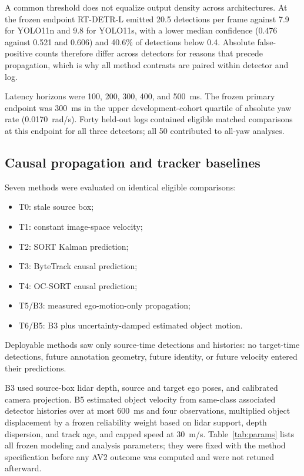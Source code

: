 \documentclass[journal]{IEEEtran}
\begin{document}
A common threshold does not equalize output density across architectures. At the frozen endpoint RT-DETR-L emitted 20.5 detections per frame against 7.9 for YOLO11n and 9.8 for YOLO11s, with a lower median confidence (0.476 against 0.521 and 0.606) and 40.6\% of detections below 0.4. Absolute false-positive counts therefore differ across detectors for reasons that precede propagation, which is why all method contrasts are paired within detector and log.

Latency horizons were 100, 200, 300, 400, and 500~ms. The frozen primary endpoint was 300~ms in the upper development-cohort quartile of absolute yaw rate (0.0170~rad/s). Forty held-out logs contained eligible matched comparisons at this endpoint for all three detectors; all 50 contributed to all-yaw analyses.

\subsection{Causal propagation and tracker baselines}
Seven methods were evaluated on identical eligible comparisons:
\begin{itemize}
\item T0: stale source box;
\item T1: constant image-space velocity;
\item T2: SORT Kalman prediction;
\item T3: ByteTrack causal prediction;
\item T4: OC-SORT causal prediction;
\item T5/B3: measured ego-motion-only propagation;
\item T6/B5: B3 plus uncertainty-damped estimated object motion.
\end{itemize}
Deployable methods saw only source-time detections and histories: no target-time detections, future annotation geometry, future identity, or future velocity entered their predictions.

B3 used source-box lidar depth, source and target ego poses, and calibrated camera projection. B5 estimated object velocity from same-class associated detector histories over at most 600~ms and four observations, multiplied object displacement by a frozen reliability weight based on lidar support, depth dispersion, and track age, and capped speed at 30~m/s. Table~\ref{tab:params} lists all frozen modeling and analysis parameters; they were fixed with the method specification before any AV2 outcome was computed and were not retuned afterward.
\end{document}
